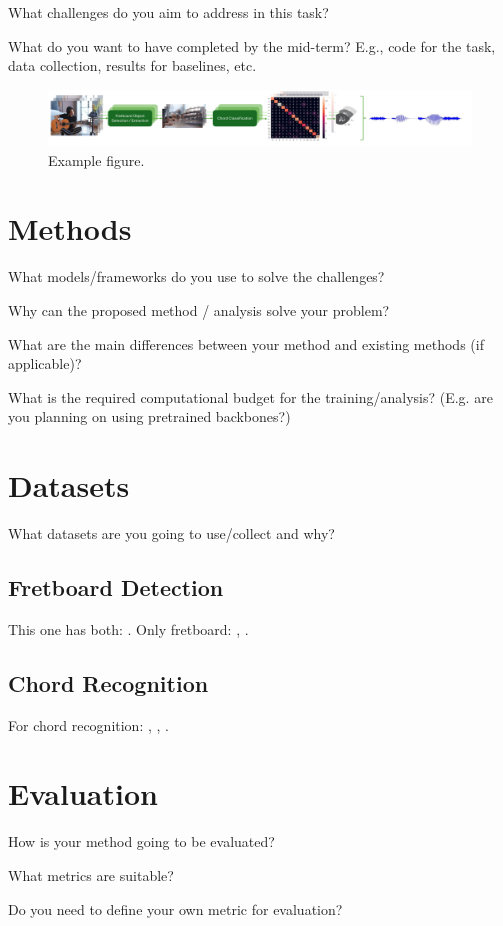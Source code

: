 \documentclass[10pt,twocolumn,letterpaper]{article}
\begin{document}
What challenges do you aim to address in this task?

What do you want to have completed by the mid-term? E.g., code for the task, data collection, results for baselines, etc.


\begin{figure}[h]\label{fig:diagram}
    \centering
    \includegraphics[width=\textwidth]{images/task-diagram.pdf}
    \caption{Example figure.}
    \label{fig:figure1}
\end{figure}


\section{Methods}

What models/frameworks do you use to solve the challenges?

Why can the proposed method / analysis solve your problem?

What are the main differences between your method and existing methods (if applicable)?

What is the required computational budget for the training/analysis? (E.g. are you planning on using pretrained backbones?)

\section{Datasets}

What datasets are you going to use/collect and why?


\subsection{Fretboard Detection}
This one has both: \cite{guitar-chords-daewp_dataset}. 
Only fretboard: \cite{guitar-ppfil_dataset}, \cite{done-npcll_dataset}.

\subsection{Chord Recognition}
For chord recognition: \cite{guitar-chord-tvon8_dataset}, \cite{guitar-chord-bounding-box_dataset}, \cite{guitar-chord-handshape_dataset}.

\section{Evaluation}

How is your method going to be evaluated?

What metrics are suitable?

Do you need to define your own metric for evaluation?

\clearpage 

{\small


}
\end{document}
